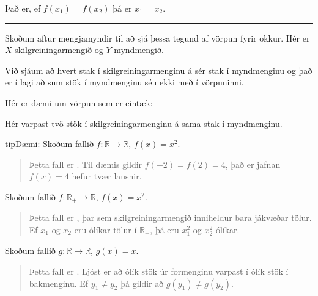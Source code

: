 \documentclass[a4paper,10pt,icelandic]{sphinxmanual}
\begin{document}
Það er, ef \(f(x_1)=f(x_2)\) þá er \(x_1=x_2\).


\bigskip\hrule\bigskip


Skoðum aftur mengjamyndir til að sjá þessa tegund af vörpun fyrir okkur.
Hér er \(X\) skilgreiningarmengið og \(Y\) myndmengið.


Við sjáum að hvert stak í skilgreiningarmenginu á sér stak í myndmenginu og það er í lagi að sum stök í myndmenginu séu ekki með í vörpuninni.

Hér er dæmi um vörpun sem er  eintæk:


Hér varpast tvö stök í skilgreiningarmenginu á sama stak í myndmenginu.

\begin{sphinxadmonition}{tip}{Dæmi:}
 Skoðum fallið \(f: \mathbb{R} \to \mathbb{R}\), \(f(x)=x^2\).
\begin{quote}

Þetta fall er . Til dæmis gildir \(f(-2)=f(2)=4\), það er jafnan \(f(x)=4\) hefur tvær lausnir.
\end{quote}

 Skoðum fallið \(f: \mathbb{R}_+ \to \mathbb{R}\), \(f(x)=x^2\).
\begin{quote}

Þetta fall er , þar sem skilgreiningarmengið inniheldur bara jákvæðar tölur. Ef \(x_1\) og \(x_2\) eru ólíkar tölur í \(\mathbb{R}_+\), þá eru \(x_1^2\) og \(x_2^2\) ólíkar.
\end{quote}

 Skoðum fallið \(g: \mathbb{R} \to \mathbb{R}\), \(g(x)=x\).
\begin{quote}

Þetta fall er . Ljóst er að ólík stök úr formenginu varpast í ólík stök í bakmenginu. Ef \(y_1 \not= y_2\) þá gildir að \(g(y_1) \not= g(y_2)\).
\end{quote}
\end{sphinxadmonition}
\end{document}

